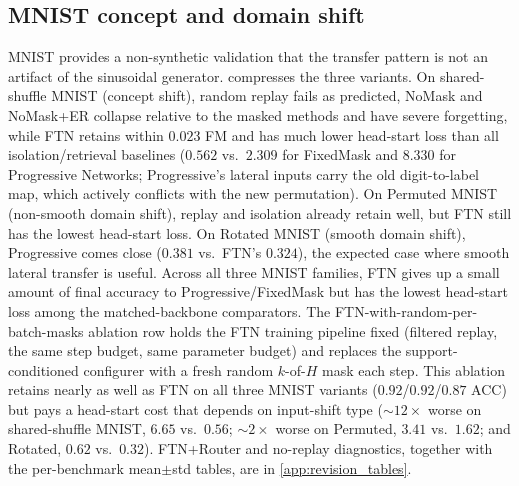 \documentclass{article}
\begin{document}
\subsection{MNIST concept and domain shift}\label{sec:results_mnist}
MNIST provides a non-synthetic validation that the transfer pattern is not an artifact of the sinusoidal generator.  compresses the three variants. On shared-shuffle MNIST (concept shift), random replay fails as predicted, NoMask and NoMask+ER collapse relative to the masked methods and have severe forgetting, while FTN retains within $0.023$ FM and has much lower head-start loss than all isolation/retrieval baselines ($0.562$ vs.\ $2.309$ for FixedMask and $8.330$ for Progressive Networks; Progressive's lateral inputs carry the old digit-to-label map, which actively conflicts with the new permutation). On Permuted MNIST (non-smooth domain shift), replay and isolation already retain well, but FTN still has the lowest head-start loss. On Rotated MNIST (smooth domain shift), Progressive comes close ($0.381$ vs.\ FTN's $0.324$), the expected case where smooth lateral transfer is useful. Across all three MNIST families, FTN gives up a small amount of final accuracy to Progressive/FixedMask but has the lowest head-start loss among the matched-backbone comparators. The FTN-with-random-per-batch-masks ablation row holds the FTN training pipeline fixed (filtered replay, the same step budget, same parameter budget) and replaces the support-conditioned configurer with a fresh random $k$-of-$H$ mask each step. This ablation retains nearly as well as FTN on all three MNIST variants ($0.92$/$0.92$/$0.87$ ACC) but pays a head-start cost that depends on input-shift type ($\sim\!12\times$ worse on shared-shuffle MNIST, $6.65$ vs.\ $0.56$; $\sim\!2\times$ worse on Permuted, $3.41$ vs.\ $1.62$; and Rotated, $0.62$ vs.\ $0.32$). FTN+Router and no-replay diagnostics, together with the per-benchmark mean$\pm$std tables, are in \cref{app:revision_tables}.
\end{document}
